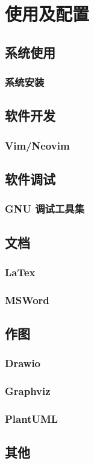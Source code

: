 \chapter{使用及配置}

\section{系统使用}
\subsection{系统安装}

\section{软件开发}
\subsection{Vim/Neovim}

\section{软件调试}
\subsection{GNU 调试工具集}

\section{文档}
\subsection{LaTex}
\subsection{MSWord}

\section{作图}
\subsection{Drawio}
\subsection{Graphviz}
\subsection{PlantUML}

\section{其他}
